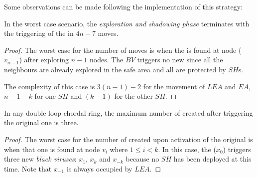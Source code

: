  
Some observations can be made following the implementation of this strategy:

\begin{theorem}
In the worst case scenario, the {\em exploration and shadowing phase}
 terminates with the triggering of the \bv  in $4n-7$ moves.

\end{theorem}
\begin{proof}
The worst case for the number of moves is 
when the \bv  is found at node ($v_{n-1}$) after exploring   $n-1$ nodes.  
The $BV$ triggers no new \bvs since all the neighbours are already explored in the safe area and all are protected by $SH$s.

 
The complexity of this case is  $3(n-1)-2$ for the movement of $LEA$ and $EA$, $n-1-k$ for one $SH$ and $(k-1)$ for the other $SH$.
\end{proof}
%

%
\begin{theorem}
In any double loop chordal ring, the maximum number of \bvs created after triggering the original one is three.

\end{theorem}

\begin{proof}
The worst case for the number of \bvs created upon activation of the original is when that one is found at node $v_i$ where $1 \leq i < k$. In this case, the \bv ($x_0$)  triggers three new {\it black viruses}:  $x_1$, $x_k$ and $x_{-k}$ because no $SH$ has been deployed at this time. Note that  $x_{-1} $ is always occupied by $LEA$.

\end{proof}

